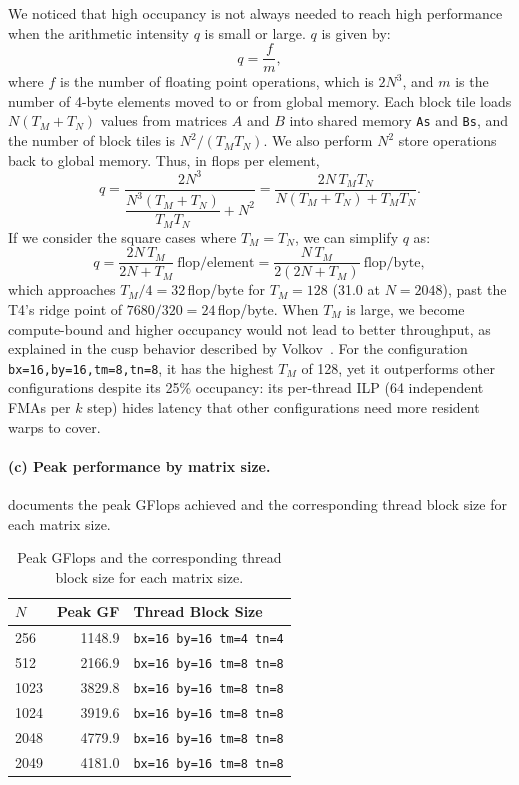\documentclass[letterpaper,twocolumn,10pt]{article}
\begin{document}
We noticed that high occupancy is not always needed to reach high performance when
the arithmetic intensity $q$ is small or large. $q$ is given by:
\begin{equation*}
q = \frac{f}{m},
\end{equation*}
where $f$ is the number of floating point operations, which is $2N^3$, and $m$ is the
number of 4-byte elements moved to or from global memory. Each block tile loads
$N(T_M + T_N)$ values from matrices $A$ and $B$ into shared memory \texttt{As} and
\texttt{Bs}, and the number of block tiles is $N^2/(T_M T_N)$. We also perform $N^2$
store operations back to global memory. Thus, in flops per element,
\begin{equation*}
q = \frac{2N^3}{\dfrac{N^3(T_M + T_N)}{T_M T_N} + N^2}
  = \frac{2N\,T_M T_N}{N(T_M + T_N) + T_M T_N}.
\end{equation*}
If we consider the square cases where $T_M = T_N$, we can simplify $q$ as:
\begin{equation*}
q = \frac{2N\,T_M}{2N + T_M}\ \text{flop/element}
  = \frac{N\,T_M}{2(2N + T_M)}\ \text{flop/byte},
\end{equation*}
which approaches $T_M/4 = 32$\,flop/byte for $T_M=128$ (31.0 at $N=2048$), past the
T4's ridge point of $7680/320 = 24$\,flop/byte.
When $T_M$ is large, we become compute-bound and higher occupancy would not lead to
better throughput, as explained in the cusp behavior described by
Volkov~\cite{volkov_occupancy}. For the configuration \texttt{bx=16,by=16,tm=8,tn=8},
it has the highest $T_M$ of 128, yet it outperforms other configurations despite its
25\% occupancy: its per-thread ILP (64 independent FMAs per $k$ step) hides latency
that other configurations need more resident warps to cover.

\paragraph{(c) Peak performance by matrix size.}
 documents the peak GFlops achieved and the corresponding thread
block size for each matrix size.

\begin{table}[t]
\centering
\caption{Peak GFlops and the corresponding thread block size for each matrix size.}
\label{tab:peakgf}
\small
\begin{tabular}{@{}l r l@{}}
\toprule
\textbf{$N$} & \textbf{Peak GF} & \textbf{Thread Block Size} \\
\midrule
256  & 1148.9 & \texttt{bx=16 by=16 tm=4 tn=4} \\
512  & 2166.9 & \texttt{bx=16 by=16 tm=8 tn=8} \\
1023 & 3829.8 & \texttt{bx=16 by=16 tm=8 tn=8} \\
1024 & 3919.6 & \texttt{bx=16 by=16 tm=8 tn=8} \\
2048 & 4779.9 & \texttt{bx=16 by=16 tm=8 tn=8} \\
2049 & 4181.0 & \texttt{bx=16 by=16 tm=8 tn=8} \\
\bottomrule
\end{tabular}
\end{table}
\end{document}
